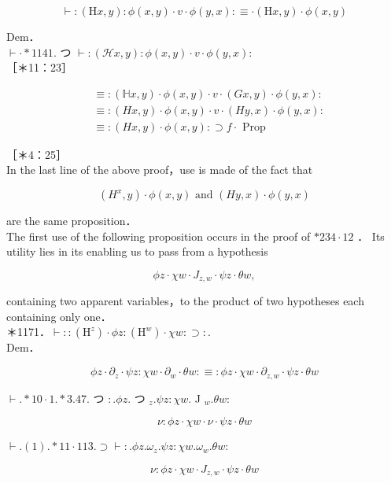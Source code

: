 \documentclass[10pt]{article}
\begin{document}
$$
\vdash:(\mathrm{H} x, y): \phi(x, y) \cdot v \cdot \phi(y, x): \equiv \cdot(\mathrm{H} x, y) \cdot \phi(x, y)
$$

Dem．\\
$\vdash \cdot * 1141$. つ $\vdash:(\mathcal{H} x, y): \phi(x, y) \cdot v \cdot \phi(y, x):$\\
［＊11：23］

$$
\begin{aligned}
& \equiv:(\mathbb{H} x, y) \cdot \phi(x, y) \cdot v \cdot(G x, y) \cdot \phi(y, x): \\
& \equiv:(H x, y) \cdot \phi(x, y) \cdot v \cdot(H y, x) \cdot \phi(y, x): \\
& \equiv:(H x, y) \cdot \phi(x, y): \supset f \cdot \text { Prop }
\end{aligned}
$$

［＊4：25］\\
In the last line of the above proof，use is made of the fact that

$$
\left(H^{x}, y\right) \cdot \phi(x, y) \text { and }(H y, x) \cdot \phi(y, x)
$$

are the same proposition．\\
The first use of the following proposition occurs in the proof of $* 234 \cdot 12$ ． Its utility lies in its enabling us to pass from a hypothesis

$$
\phi z \cdot \chi w \cdot J_{z, w} \cdot \psi z \cdot \theta w,
$$

containing two apparent variables，to the product of two hypotheses each containing only one．\\
＊1171．$\vdash::\left(\mathrm{H}^{z}\right) \cdot \phi z:\left(\mathrm{H}^{w}\right) \cdot \chi w: \supset:$.\\
Dem．

$$
\phi z \cdot \partial_{z} \cdot \psi z: \chi w \cdot \partial_{w} \cdot \theta w: \equiv: \phi z \cdot \chi w \cdot \partial_{z, w} \cdot \psi z \cdot \theta w
$$

$\vdash . * 10 \cdot 1 . * 3.47$. つ $: . \phi z$. つ $_{z} . \psi z: \chi w$. J $_{w} . \theta w:$


\begin{equation*}
\nu: \phi z \cdot \chi w \cdot \nu \cdot \psi z \cdot \theta w \tag{1}
\end{equation*}


$\vdash .(1) . * 11 \cdot 113 . \supset \vdash: . \phi z . \omega_{z} . \psi z: \chi w . \omega_{w} . \theta w:$


\begin{equation*}
\nu: \phi z \cdot \chi w \cdot J_{z, w} \cdot \psi z \cdot \theta w \tag{2}
\end{equation*}
\end{document}
